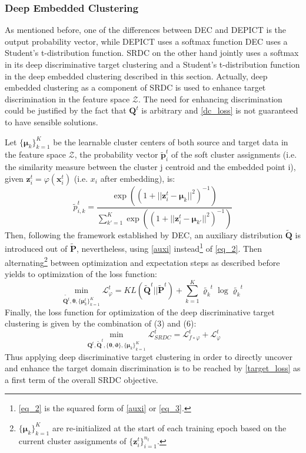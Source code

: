 \documentclass[runningheads]{llncs}
\begin{document}
\subsubsection*{Deep Embedded Clustering} 
As mentioned before, one of the differences between DEC and DEPICT is the output probability vector, while DEPICT uses a softmax function DEC uses a Student's t-distribution function. SRDC on the other hand jointly uses a softmax in its deep discriminative target clustering and a Student's t-distribution function in the deep embedded clustering described in this section. Actually, deep embedded clustering as a component of SRDC is used to enhance target discrimination in the feature space $\mathcal{Z}$. The need for enhancing discrimination could be justified by the fact that $\boldsymbol{Q}^t$ is arbitrary and \eqref{dc_loss} is not guaranteed to have sensible solutions.

Let $\{\boldsymbol{\mu}_k\}^{K}_{k=1}$ be the learnable cluster centers of both source and target data in the feature space $\mathcal{Z}$, the probability vector $\tilde{\boldsymbol{p}}^t_{i}$ of the soft cluster assignments (i.e. the similarity measure between the cluster j centroid and the embedded point i), given $\boldsymbol{z}_i^t = \varphi(\boldsymbol{x}_i^t)$ (i.e. $x_i$ after embedding), is:
\begin{equation}
\tilde{p}^t_{i,k} = \frac{\exp((1 + ||\boldsymbol{z}^t_i - \boldsymbol{\mu}_k||^2)^{-1})}{\sum_{k'=1}^{K}\exp((1 + ||\boldsymbol{z}^t_i - \boldsymbol{\mu}_{k'}||^2)^{-1})}
\label{student}
\end{equation}
Then, following the framework established by DEC, an auxiliary distribution $\tilde{\boldsymbol{Q}}$ is introduced out of $\tilde{\boldsymbol{P}}$, nevertheless, using \eqref{auxi} instead\footnote{\eqref{eq_2} is the squared form of \eqref{auxi} or \eqref{eq_3}.} of \eqref{eq_2}. Then alternating\footnote{$\{\boldsymbol{\mu}_k\}^{K}_{k=1}$ are re-initialized at the start of each training epoch based on the current cluster assignments of $\{\boldsymbol{z}^t_i\}^{n_t}_{i=1}$.} between optimization and expectation steps as described before yields to optimization of the loss function:
\begin{equation}
\min\limits_{\tilde{\boldsymbol{Q}^t},{\boldsymbol{\theta}},\{\boldsymbol{\mu}^t_k\}^{K}_{k=1}}\mathcal{L}_{\varphi}^t = KL(\tilde{\boldsymbol{Q}}^t||\tilde{\boldsymbol{P}}^t) + \sum_{k=1}^{K} \tilde{\varrho_k}^t \log \tilde{\varrho_k}^t
\end{equation}
Finally, the loss function for optimization of the deep discriminative target clustering is given by the combination of (3) and (6):
\begin{equation}
\min\limits_{\boldsymbol{Q}^t, \boldsymbol{\tilde{Q}}^t, \{{\boldsymbol{\theta}, \boldsymbol{\vartheta}\}}, \{{\boldsymbol{\mu}_k\}}_{k=1}^K}\mathcal{L}_{SRDC}^t = \mathcal{L}_{{f \circ \varphi}}^t + \mathcal{L}_\varphi^t
\label{target_loss}
\end{equation}
Thus applying deep discriminative target clustering in order to directly uncover and enhance the target domain discrimination is to be reached by \eqref{target_loss} as a first term of the overall SRDC objective.
\end{document}

